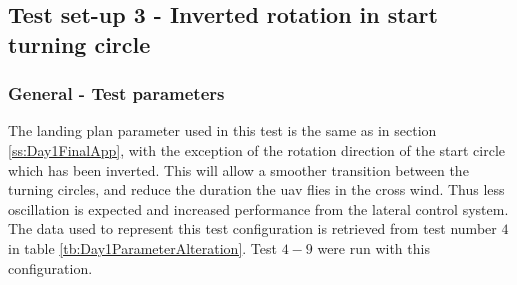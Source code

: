 \subsection{Test set-up 3 - Inverted rotation in start turning circle}\label{ss:Day1Inverted}
\subsubsection{General - Test parameters}
The landing plan parameter used in this test is the same as in section \ref{ss:Day1FinalApp}, with the exception of the rotation direction of the start circle which has been inverted. This will allow a smoother transition between the turning circles, and reduce the duration the \gls{uav} flies in the cross wind. Thus less oscillation is expected and increased performance from the lateral control system. The data used to represent this test configuration is retrieved from test number $4$ in table \ref{tb:Day1ParameterAlteration}. Test $4-9$ were run with this configuration.
